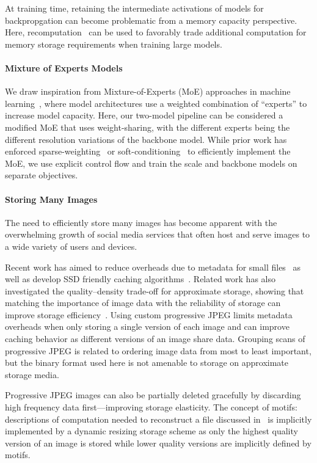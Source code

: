 At training time, retaining the intermediate activations of models for backpropgation can become problematic from a memory capacity perspective.
Here, recomputation~\cite{chen2016xgboost, kirisame2020dynamic} can be used to favorably trade additional computation for memory storage requirements when training large models.

\paragraph{Mixture of Experts Models}
We draw inspiration from Mixture-of-Experts (MoE) approaches in machine learning~\cite{jacobs1991adaptive, shazeer2017outrageously, yang2019soft, lepikhin2020gshard}, where model architectures use a weighted combination of ``experts'' to increase model capacity.
Here, our two-model pipeline can be considered a modified MoE that uses weight-sharing, with the different experts being the different resolution variations of the backbone model.
While prior work has enforced sparse-weighting~\cite{shazeer2017outrageously} or soft-conditioning~\cite{yang2019soft} to efficiently implement the MoE, we use explicit control flow and train the scale and backbone models on separate objectives.


\paragraph{Storing Many Images}
The need to efficiently store many images has become apparent with the overwhelming growth of social media services that often host and serve images to a wide variety of users and devices.

Recent work has aimed to reduce overheads due to metadata for small files~\cite{beaver2010finding} as well as develop SSD friendly caching algorithms~\cite{tang2015ripq}. 
Related work has also investigated the quality--density trade-off for approximate storage, showing that matching the importance of image data with the reliability of storage can improve storage efficiency~\cite{guo2016high}. 
Using custom progressive JPEG limits metadata overheads when only storing a single version of each image and can improve caching behavior as different versions of an image share data.
Grouping scans of progressive JPEG is related to ordering image data from most to least important, but the binary format used here is not amenable to storage on approximate storage media.

Progressive JPEG images can also be partially deleted gracefully by discarding high frequency data first---improving storage elasticity.
The concept of motifs: descriptions of computation needed to reconstruct a file discussed in~\cite{183605, carillon} is implicitly implemented by a dynamic resizing storage scheme as only the highest quality version of an image is stored while lower quality versions are implicitly defined by motifs.

